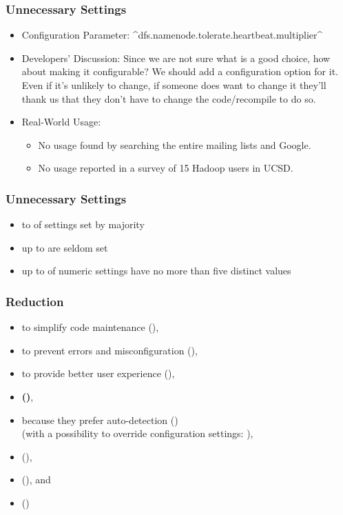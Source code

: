 \begin{frame}[fragile]
	\frametitle{Unnecessary Settings~\cite{xu2015hey}}
	\begin{itemize}
	\item Configuration Parameter: ^dfs.namenode.tolerate.heartbeat.multiplier^
	\item Developers' Discussion:
	Since we are not sure what is a good choice, how about making it
	configurable?
	We should add a configuration option for it. Even if it's unlikely to
	change, if someone does want to change it they'll thank us that they
	don't have to change the code/recompile to do so.
	\item Real-World Usage:
	\begin{itemize}
	\item No usage found by searching the entire mailing lists and Google.
	\item No usage reported in a survey of 15 Hadoop users in UCSD.
	\end{itemize}
	\end{itemize}
\end{frame}

\begin{frame}
	\frametitle{Unnecessary Settings~\cite{xu2015hey}}
	\begin{itemize}
	\item {} to  of settings set by majority
	\item up to  are seldom set
	\item up to  of numeric settings have no more than five distinct values
	\end{itemize}
\end{frame}

\begin{frame}
	\frametitle{Reduction}
	\methodQuestion{}
	\begin{itemize}
	\item to simplify code maintenance (),
	\item to prevent errors and misconfiguration (),
	\item to provide better user experience (),
	\item \textbf{ ()},
	\item because they prefer auto-detection () \\ (with a possibility to override configuration settings: ),
	\item {} (),
	\item {} (), and
	\item {} ()
	\end{itemize}
\end{frame}

